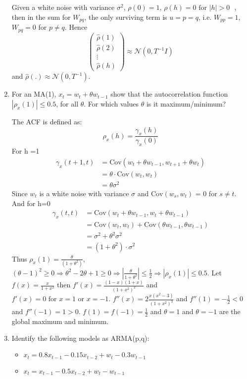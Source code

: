 \documentclass{article}
\newcommand{\0}{\mat{0}}
\newcommand{\Cov}{\mathrm{Cov}}
\newenvironment{solution}{\vspace{.25cm}\noindent{\it Solution:}}{}
\begin{document}
\begin{enumerate}
	Given a white noise with variance $\sigma^2$, $\rho(0)=1$, $\rho(h)=0 \text{ for $|h| > 0$ }$, then in the sum for $W_{pq}$, the only surviving term is $u = p = q$, i.e. $W_{pp}=1$, $W_{pq} = 0$ for $p \ne q$. 
	Hence 
	\[
		\begin{pmatrix}
    			\hat{\rho}(1) \\ \hat{\rho}(2)  \\ \vdots \\  \hat{\rho}(h)
		\end{pmatrix}
		\approx  \mathcal{N}(0,T^{-1} I)
	\] and $\hat{\rho}(.) \approx \mathcal{N}(0,T^{-1})$.
		
	\item For an MA(1), $x_t = w_t + \theta w_{t-1}$ show that the autocorrelation function $|\rho_x(1)| \le 0.5$, for all $\theta$.
	For which values $\theta$ is it maximum/minimum?
	
	\begin{solution}
	The ACF is defined as:
	\[
		\rho_x(h) = \frac{\gamma_x(h)}{\gamma_x(0)}
	\]
	For h =1
	\begin{align*}
		\gamma_x(t+1, t) &= \Cov{(w_t + \theta w_{t-1},  w_{t+1} + \theta w_t)} \\
						&=  \theta \cdot  \Cov{(w_t, w_t)}\\
						&= \theta \sigma^2
	\end{align*}
	Since $w_t$ is a white noise with variance $\sigma$ and $\Cov{(w_s, w_t)}$ = 0 for $s \ne t$.
	And for h=0
	\begin{align*}
		\gamma_x(t, t) &= \Cov{(w_t + \theta w_{t-1},  w_t + \theta w_{t-1})} \\
						&=  \Cov{(w_t, w_t)} +  \Cov{(\theta w_{t-1}, \theta w_{t-1})}\\
						&= \sigma^2 + \theta^2 \sigma^2 \\
						&= (1+\theta^2) \cdot \sigma^2
	\end{align*}
	Thus $\rho_x(1) = \frac{\theta}{(1+\theta^2)}$, $(\theta -1)^2 \ge 0 \Rightarrow  \theta^2 -2 \theta + 1 \ge 0 \Rightarrow |\frac{\theta}{1+\theta^2}| \le \frac{1}{2} \Rightarrow |\rho_x(1)| \le 0.5$.
	Let $f(x) = \frac{x}{1 + x^2}$ then $f'(x) = \frac{(1-x) (1+x)}{(1+x^2)^2}$ and $f'(x) = 0 \text{ for } x = 1 \text{ or } x =-1$. $f''(x) = 2 \frac{x (x^2-3)}{(1+x^2)^3}$  and $f''(1) = - \frac{1}{2} < 0$ and $f''(-1) = 1 > 0$.
	$f(1) = f(-1) = \frac{1}{2}$ and $\theta=1$ and $\theta=-1$ are the global maximum and minimum. 
	
	\item Identify the following models as ARMA(p,q):
	\begin{itemize}
		\item $x_t = 0.8 x_{t-1} - 0.15 x_{t-2} + w_t - 0.3 w_{t-1}$
		\item $x_t = x_{t-1} - 0.5 x_{t-2}  + w_t - w_{t-1}$
	\end{itemize}	
	

\end{solution}
\end{enumerate}
\end{document}
